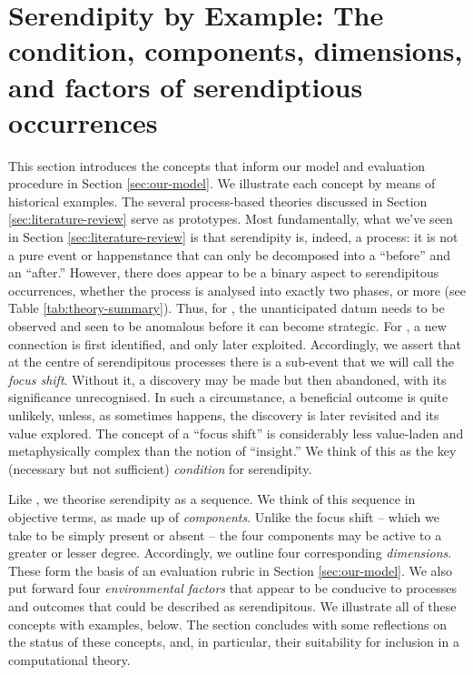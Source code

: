 \section{Serendipity by Example: The condition, components, dimensions, and factors of serendiptious occurrences} \label{sec:by-example}

This section introduces the concepts that inform our model and
evaluation procedure in Section \ref{sec:our-model}.  We illustrate
each concept by means of historical examples.  The several
process-based theories discussed in Section
\ref{sec:literature-review} serve as prototypes.
Most fundamentally, what we've seen in Section
\ref{sec:literature-review} is that serendipity is, indeed, a process:
it is not a pure event or happenstance that can only be decomposed
into a ``before'' and an ``after.''  However, there does appear to be
a binary aspect to serendipitous occurrences, whether the process is
analysed into exactly two phases, or more (see Table
\ref{tab:theory-summary}).  Thus, for \citet{merton1948bearing}, the
unanticipated datum needs to be observed and seen to be anomalous
before it can become strategic.  For \citet{Makri2012a}, a new
connection is first identified, and only later exploited.
Accordingly, we assert that at the centre of serendipitous processes
there is a sub-event that we will call the \emph{focus shift}.
Without it, a discovery may be made but then abandoned, with its significance unrecognised.
In such a circumstance, a beneficial outcome is quite unlikely,
unless, as sometimes happens, the discovery is later revisited and its
value explored.  The concept of a ``focus shift'' is considerably less
value-laden and metaphysically complex than the notion of ``insight.''
We think of this as the key (necessary but not sufficient)
\emph{condition} for serendipity.

Like \citet{lawley2008maximising}, we theorise serendipity as a sequence.
We think of this sequence in objective terms, as made up of \emph{components}. 
Unlike the focus shift -- which we take to be simply present or absent -- the
four components may be active to a greater or lesser degree.
Accordingly, we outline four corresponding \emph{dimensions}.  These
form the basis of an evaluation rubric in Section \ref{sec:our-model}.
We also put forward four \emph{environmental factors} that appear to be
conducive to processes and outcomes that could be described as
serendipitous.  We illustrate all of these concepts with examples,
below.
The section concludes with some reflections on the status of these
concepts, and, in particular, their suitability for inclusion in a
computational theory.

